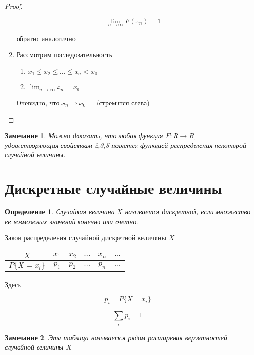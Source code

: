 \documentclass[a4paper, 14pt]{report}
\newtheorem{defenition}{Определение}[section]
\newtheorem{note}{Замечание}[section]
\begin{document}
\begin{proof}
\begin{enumerate}
            $$
            \lim_{n \to \infty} F(x_n) = 1
            $$

            обратно аналогично

        \item Рассмотрим последовательность

            \begin{enumerate}
                \item $x_1 \le x_2 \le ... \le x_n < x_0$
                \item $\lim_{n \to \infty} x_n = x_0$
            \end{enumerate}

            Очевидно, что $x_n \to x_0 -$ (стремится слева)

    \end{enumerate}
\end{proof}

\begin{note}
    Можно доказать, что любая функция $F : R \to R$, удовлетворяющая свойствам 2,3,5 является функцией распределения некоторой случайной величины. 
\end{note}

\section{Дискретные случайные величины}

\begin{defenition}
    Случайная величина $X$ называется дискретной, если множество ее возможных значений конечно или счетно.
\end{defenition}

Закон распределения случайной дискретной величины $X$

\begin{tabular}{c|c|c|c|c|c}
    \hline
    $X$ & $x_1$ & $x_2$ & $...$ & $x_n$ & $...$ \\
    \hline
    $P\{X = x_i\}$ & $p_1$ & $p_2$ & $...$ & $p_n$ & $...$ \\
    \hline
\end{tabular}

Здесь

$$
p_i = P\{X = x_i\}
$$


$$
\sum_i p_i = 1
$$

\begin{note}
    Эта таблица называется рядом расширения вероятностей случайной величины $X$ 
\end{note}
\end{document}
